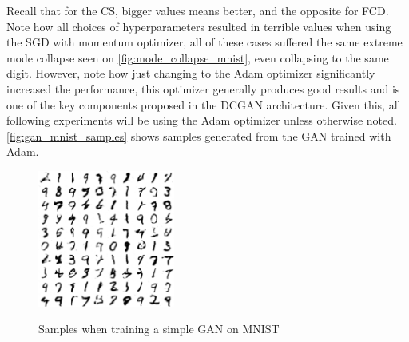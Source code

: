 Recall that for the \gls{CS}, bigger values means better, and the opposite for \gls{FCD}. Note how all choices of hyperparameters resulted in terrible values when using the \gls{SGD} with momentum optimizer, all of these cases suffered the same extreme mode collapse seen on \autoref{fig:mode_collapse_mnist}, even collapsing to the same digit. However, note how just changing to the Adam optimizer significantly increased the performance, this optimizer generally produces good results \cite{nipsGAN2017} and is one of the key components proposed in the DCGAN architecture. Given this, all following experiments will be using the Adam optimizer unless otherwise noted. \autoref{fig:gan_mnist_samples} shows samples generated from the \gls{GAN} trained with Adam.
\begin{figure}[hbt]
    \centering
    \caption{Samples when training a simple GAN on MNIST}
    \includegraphics[width=0.4\textwidth]{chapters/Experiments/GAN/mnist_samples.png}
    \label{fig:gan_mnist_samples}
\end{figure}
